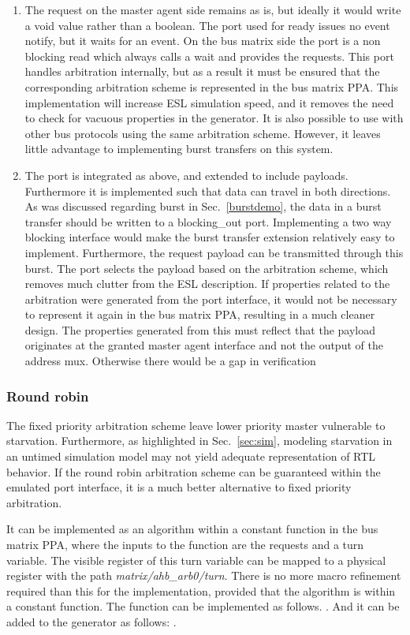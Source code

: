 \begin{enumerate}
 \item The request on the master agent side remains as is, but ideally it would write a void value rather than a boolean. The port used for ready issues no event notify, but it waits for an event. On the bus matrix side the port is a non blocking read which always calls a wait and provides the requests. This port handles arbitration internally, but as a result it must be ensured that the corresponding arbitration scheme is represented in the bus matrix PPA. This implementation will increase ESL simulation speed, and it removes the need to check for vacuous properties in the generator. It is also possible to use with other bus protocols using the same arbitration scheme. However, it leaves little advantage to implementing burst transfers on this system. 
 \item The port is integrated as above, and extended to include payloads. Furthermore it is implemented such that data can travel in both directions. As was discussed regarding burst in Sec.~\ref{burstdemo}, the data in a burst transfer should be written to a blocking\_out port. Implementing a two way blocking interface would make the burst transfer extension relatively easy to implement. Furthermore, the request payload can be transmitted through this burst. The port selects the payload based on the arbitration scheme, which removes much clutter from the ESL description. If properties related to the arbitration were generated from the port interface, it would not be necessary to represent it again in the bus matrix PPA, resulting in a much cleaner design. The properties generated from this must reflect that the payload originates at the granted master agent interface and not the output of the address mux. Otherwise there would be a gap in verification
\end{enumerate}

\subsubsection{Round robin}
The fixed priority arbitration scheme leave lower priority master vulnerable to starvation. Furthermore, as highlighted in Sec.~\ref{sec:sim}, modeling starvation in an untimed simulation model may not yield adequate representation of RTL behavior. If the round robin arbitration scheme can be guaranteed within the emulated port interface, it is a much better alternative to fixed priority arbitration. \par
It can be implemented as an algorithm within a constant function in the bus matrix PPA, where the inputs to the function are the requests and a turn variable. The visible register of this turn variable can be mapped to a physical register with the path \textit{matrix/ahb\_arb0/turn}. There is no more macro refinement required than this for the implementation, provided that the algorithm is within a constant function. The function can be implemented as follows. .
And it can be added to the generator as follows: .



